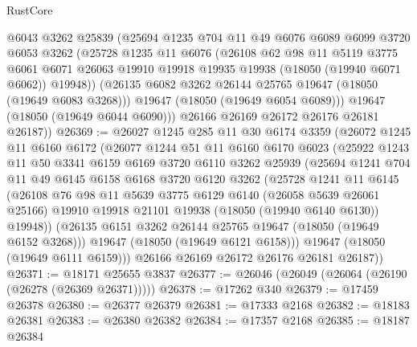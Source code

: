 \begin{lexlean}{RustCore}
\begin{coremodule}
          @6043
          @3262
          @25839
          (@25694
            @1235
            @704
            @11
            @49
            @6076
            @6089
            @6099
            @3720
            @6053
            @3262
            (@25728
              @1235
              @11
              @6076
              (@26108
                @62
                @98
                @11
                @5119
                @3775
                @6061
                @6071
                @26063
                @19910
                @19918
                @19935
                @19938
                (@18050 (@19940 @6071 @6062))
                @19948))
            (@26135 @6082 @3262 @26144 @25765 @19647 (@18050 (@19649 @6083 @3268)))
            @19647
            (@18050 (@19649 @6054 @6089)))
          @19647
          (@18050 (@19649 @6044 @6090)))
        @26166
        @26169
        @26172
        @26176
        @26181
        @26187))
@26369 := @26027
    @1245
    @285
    @11
    @30
    @6174
    @3359
    (@26072
      @1245
      @11
      @6160
      @6172
      (@26077
        @1244
        @51
        @11
        @6160
        @6170
        @6023
        (@25922
          @1243
          @11
          @50
          @3341
          @6159
          @6169
          @3720
          @6110
          @3262
          @25939
          (@25694
            @1241
            @704
            @11
            @49
            @6145
            @6158
            @6168
            @3720
            @6120
            @3262
            (@25728
              @1241
              @11
              @6145
              (@26108
                @76
                @98
                @11
                @5639
                @3775
                @6129
                @6140
                (@26058 @5639 @26061 @25166)
                @19910
                @19918
                @21101
                @19938
                (@18050 (@19940 @6140 @6130))
                @19948))
            (@26135 @6151 @3262 @26144 @25765 @19647 (@18050 (@19649 @6152 @3268)))
            @19647
            (@18050 (@19649 @6121 @6158)))
          @19647
          (@18050 (@19649 @6111 @6159)))
        @26166
        @26169
        @26172
        @26176
        @26181
        @26187))
@26371 := @18171 @25655 @3837
@26377 := @26046 (@26049 (@26064 (@26190 (@26278 (@26369 @26371)))))
@26378 := @17262 @340
@26379 := @17459 @26378
@26380 := @26377 @26379
@26381 := @17333 @2168
@26382 := @18183 @26381
@26383 := @26380 @26382
@26384 := @17357 @2168
@26385 := @18187 @26384

\end{coremodule}
\end{lexlean}
